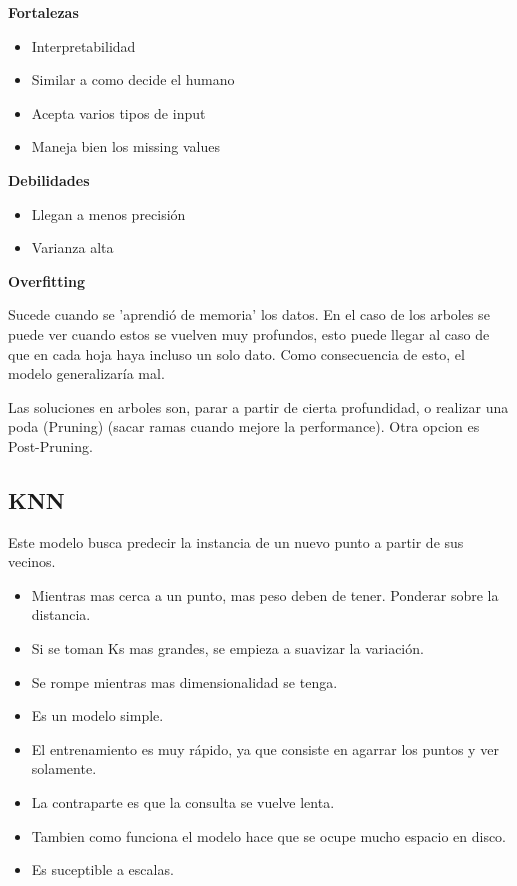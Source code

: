\documentclass[titlepage,a4paper]{article}
\begin{document}

\textbf{Fortalezas}

\begin{itemize}
    \item Interpretabilidad
    \item Similar a como decide el humano
    \item Acepta varios tipos de input
    \item Maneja bien  los missing values
\end{itemize}

\textbf{Debilidades}

\begin{itemize}
    \item Llegan a menos precisión
    \item Varianza alta
\end{itemize}

\textbf{Overfitting}

Sucede cuando se 'aprendió de memoria' los datos. En el caso de los arboles se puede ver cuando estos se vuelven muy profundos, esto puede llegar al caso de que en cada hoja haya incluso un solo dato. Como consecuencia de esto, el modelo generalizaría mal.

Las soluciones en arboles son, parar a partir de cierta profundidad, o realizar una poda (Pruning)  (sacar ramas cuando mejore la performance). Otra opcion es Post-Pruning.

\subsection{KNN}
Este modelo busca predecir la instancia de un nuevo punto a partir de sus vecinos.

\begin{itemize}
    \item Mientras mas cerca a un punto, mas peso deben de tener. Ponderar sobre la distancia.
    \item Si se toman Ks mas grandes, se empieza a suavizar la variación.
    \item Se rompe mientras mas dimensionalidad se tenga.
    \item Es un modelo simple.
    \item El entrenamiento es muy rápido, ya que consiste en agarrar los puntos y ver solamente.
    \item La contraparte es que la consulta se vuelve lenta.
    \item Tambien como funciona el modelo hace que se ocupe mucho espacio en disco.
    \item Es suceptible a escalas.
\end{itemize}
\end{document}
